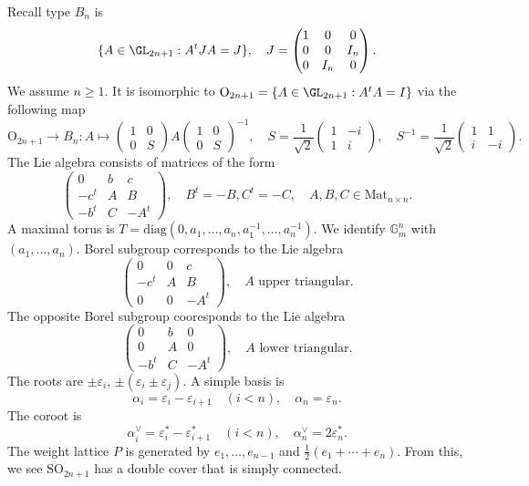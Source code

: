 \documentclass[a4paper]{amsart}
\newcommand{\BG}{{\mathbb {G}}} \newcommand{\BH}{{\mathbb {H}}}
\newcommand{\RO}{{\mathrm {O}}} \newcommand{\RP}{{\mathrm {P}}}
\newcommand{\diag}{{\mathrm{diag}}}
\newcommand{\SO}{{\mathrm{SO}}}\newcommand{\so}{\mathfrak{so}}
\theoremstyle{plain}
\theoremstyle{remark} \newtheorem{remark}[thm]{Remark}
\theoremstyle{remark} \newtheorem{exercise}{Exercise}
\theoremstyle{remark} \newtheorem{example}{Example}
\numberwithin{equation}{section}
\begin{document}
Recall type $B_n$ is
\[\{A\in\GL_{2n+1}: A^tJA=J\},\quad J=\begin{pmatrix}1&0&0\\0&0&I_n\\0&I_n&0\end{pmatrix}.\]
We assume $n\geqslant 1$. It is isomorphic to $\RO_{2n+1}=\{A\in\GL_{2n+1}:A^tA=I\}$ via the following map
\[\RO_{2n+1}\to B_n:A\mapsto \begin{pmatrix}1&0\\0&S\end{pmatrix}A\begin{pmatrix}1&0\\0&S\end{pmatrix}^{-1},\quad S=\frac{1}{\sqrt 2}\begin{pmatrix}1&-i\\1&i\end{pmatrix},\quad S^{-1}=\frac{1}{\sqrt 2}\begin{pmatrix}1&1\\i&-i\end{pmatrix}.\]
The Lie algebra consists of matrices of the form
\[\begin{pmatrix}0&b&c\\-c^t&A&B\\-b^t&C&-A^t\end{pmatrix},\quad B^t=-B,C^t=-C,\quad A,B,C\in\mathrm{Mat}_{n\times n}.\]
A maximal torus is $T=\diag(0,a_1,\ldots,a_n,a_1^{-1},\ldots,a_n^{-1})$. We identify $\BG_m^n$ with $(a_1,\ldots,a_n)$. Borel subgroup corresponds to the Lie algebra
\[\begin{pmatrix}0&0&c\\-c^t&A&B\\0&0&-A^t\end{pmatrix},\quad A\text{ upper triangular}.\]
The opposite Borel subgroup cooresponds to the Lie algebra
\[\begin{pmatrix}0&b&0\\0&A&0\\-b^t&C&-A^t\end{pmatrix},\quad A\text{ lower triangular}.\]
The roots are $\pm\varepsilon_i$, $\pm(\varepsilon_i\pm \varepsilon_j)$. A simple basis is
\[\alpha_i=\varepsilon_i-\varepsilon_{i+1}\quad(i<n),\quad \alpha_n=\varepsilon_n.\]
The coroot is
\[\alpha_i^\vee=\varepsilon_i^*-\varepsilon_{i+1}^*\quad (i<n),\quad\alpha_n^\vee=2\varepsilon^*_n.\]
The weight lattice $P$ is generated by $e_1,\ldots,e_{n-1}$ and $\frac{1}{2}(e_1+\cdots+e_n)$. From this, we see $\SO_{2n+1}$ has a double cover that is simply connected.
\end{document}
